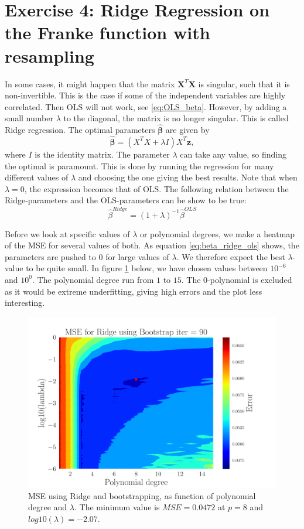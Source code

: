 \documentclass[reprint,english,notitlepage,aps,nobalancelastpage,nofootinbib]{revtex4-1}  %
\newcommand{\vc}[1]{\mathbf{#1}}
\begin{document}
\section*{Exercise 4: Ridge Regression on the Franke function with resampling}
In some cases, it might happen that the matrix $\mathbf{X}^T\mathbf{X}$ is singular, such that it is non-invertible. This is the case if some of the independent variables are highly correlated. Then OLS will not work, see \eqref{eq:OLS_beta}. However, by adding a small number $\lambda$ to the diagonal, the matrix is no longer singular. This is called Ridge regression. The optimal parameters $\boldsymbol{\hat\beta}$ are given by
\begin{equation}
	\boldsymbol{\hat{\beta}} = (X^TX+\lambda I)X^T\vc{z},
\end{equation}
where $I$ is  the identity matrix. The parameter $\lambda$ can take any value, so finding the optimal is paramount. This is done by running the regression for many different values of $\lambda$ and choosing the one giving the best results.  Note that when $\lambda=0$, the expression becomes that of OLS. The following relation between the Ridge-parameters and the OLS-parameters can be show to be true:
\begin{equation}\label{eq:beta_ridge_ols}
	\hat{\beta}^{Ridge} = (1 + \lambda)^{-1}\hat{\beta}^{OLS}
\end{equation}

Before we look at specific values of $\lambda$ or polynomial degrees, we make a heatmap of the MSE for several values of both. As equation \eqref{eq:beta_ridge_ols} shows, the parameters are pushed to $0$ for large values of $\lambda$. We therefore expect the best $\lambda$-value to be quite small. In figure \ref{fig:Ridge-boot_heatmap} below, we have chosen values between $10^{-6}$ and $10^0$. The polynomial degree run from $1$ to $15$. The 0-polynomial is excluded as it would be extreme underfitting, giving high errors and the plot less interesting.

\begin{figure}[H]
	\includegraphics[width=\linewidth]{Contour_PL_Ridge_Bootstrap90_n30_eps0.2_p1_15_lmb0_m6.pdf}
	\caption{MSE using Ridge and bootstrapping, as function of polynomial degree and $\lambda$. The minimum value is $MSE=0.0472$ at $p=8$ and $log10(\lambda) = -2.07$.}
	\label{fig:Ridge-boot_heatmap}
\end{figure}
\end{document}
